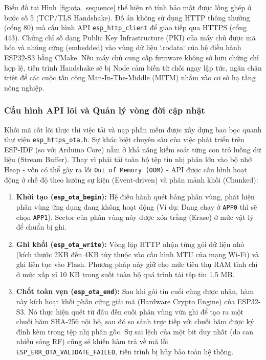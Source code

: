 Biểu đồ tại Hình \ref{fig:ota_sequence} thể hiện rõ tính bảo mật được lồng ghép ở bước số 5 (TCP/TLS Handshake). Đồ án không sử dụng HTTP thông thường (cổng 80) mà cấu hình API \texttt{esp\_http\_client} để giao tiếp qua HTTPS (cổng 443). Chứng chỉ số dạng Public Key Infrastructure (PKI) của máy chủ được mã hóa và nhúng cứng (embedded) vào vùng dữ liệu `.rodata` của hệ điều hành ESP32-S3 bằng CMake. Nếu máy chủ cung cấp firmware không sở hữu chứng chỉ hợp lệ, tiến trình Handshake sẽ bị Node cảm biến từ chối ngay lập tức, ngăn chặn triệt để các cuộc tấn công Man-In-The-Middle (MITM) nhắm vào cơ sở hạ tầng nông nghiệp.

\subsubsection{Cấu hình API lõi và Quản lý vòng đời cập nhật}
Khối mã cốt lõi thực thi việc tải và nạp phần mềm được xây dựng bao bọc quanh thư viện \texttt{esp\_https\_ota.h}. Sự khác biệt chuyên sâu của việc phát triển trên ESP-IDF (so với Arduino Core) nằm ở khả năng kiểm soát từng con trỏ luồng dữ liệu (Stream Buffer). Thay vì phải tải toàn bộ tệp tin nhị phân lớn vào bộ nhớ Heap - vốn có thể gây ra lỗi \texttt{Out of Memory (OOM)} - API được cấu hình hoạt động ở chế độ theo hướng sự kiện (Event-driven) và phân mảnh khối (Chunked):

\begin{enumerate}
    \item \textbf{Khởi tạo (\texttt{esp\_ota\_begin}):} Hệ điều hành quét bảng phân vùng, phát hiện phân vùng ứng dụng đang không hoạt động (Ví dụ: Đang chạy ở \texttt{APP0} thì sẽ chọn \texttt{APP1}). Sector của phân vùng này được xóa trắng (Erase) ở mức vật lý để chuẩn bị ghi.
    \item \textbf{Ghi khối (\texttt{esp\_ota\_write}):} Vòng lặp HTTP nhận từng gói dữ liệu nhỏ (kích thước 2KB đến 4KB tùy thuộc vào cấu hình MTU của mạng Wi-Fi) và ghi liên tục vào Flash. Phương pháp này giữ cho mức tiêu thụ RAM tĩnh chỉ ở mức xấp xỉ 10 KB trong suốt toàn bộ quá trình tải tệp tin 1.5 MB.
    \item \textbf{Chốt toàn vẹn (\texttt{esp\_ota\_end}):} Sau khi gói tin cuối cùng được nhận, hàm này kích hoạt khối phần cứng giải mã (Hardware Crypto Engine) của ESP32-S3. Nó thực hiện quét từ đầu đến cuối phân vùng vừa ghi để tạo ra một chuỗi băm SHA-256 nội bộ, sau đó so sánh trực tiếp với chuỗi băm được ký đính kèm trong tệp nhị phân gốc. Sự sai lệch của một bit duy nhất (do can nhiễu sóng RF) cũng sẽ khiến hàm trả về mã lỗi \texttt{ESP\_ERR\_OTA\_VALIDATE\_FAILED}, tiến trình bị hủy bảo toàn hệ thống.
\end{enumerate}


